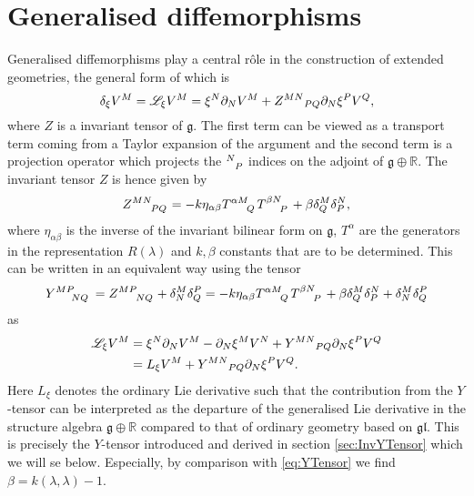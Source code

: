 \section{Generalised diffemorphisms}
Generalised diffemorphisms play a central rôle in the construction of extended geometries, the general form of which is
\begin{equation}
    \delta_\xi V^M = \mathscr{L}_\xi V^M = \xi^N\pd_N V^M+\tensor{Z}{^M^N}_{PQ}\pd_N\xi^PV^Q,
\end{equation}
where $Z$ is a invariant tensor of $\mathfrak{g}$. The first term can be viewed as a transport term coming from a Taylor expansion of the argument and the second term is a projection operator which projects the $\tensor{}{^N_P}$ indices on the adjoint of $\mathfrak{g}\oplus \mathbb{R}$. The invariant tensor $Z$ is hence given by 
\begin{equation}
    \tensor{Z}{^M^N_P_Q} = -k\eta_{\alpha\beta}\tensor{T}{^\alpha^M_Q}\tensor{T}{^\beta^N_P}+\beta\delta^M_Q\delta^N_P,
\end{equation}
where $\eta_{\alpha\beta}$ is the inverse of the invariant bilinear form on $\mathfrak{g}$, $T^{\alpha}$ are the generators in the representation $R(\lambda)$ and $k,\beta$ constants that are to be determined. This can be written in an equivalent way using the tensor
\begin{equation}\label{eq:Y}
    \tensor{Y}{^M^P_N_Q} = \tensor{Z}{^M^P_N_Q}+\delta^M_N\delta^P_Q = -k\eta_{\alpha\beta}\tensor{T}{^\alpha^M_Q}\tensor{T}{^\beta^N_P}+\beta\delta^M_Q\delta^N_P+\delta^M_N\delta^P_Q
\end{equation}
as 
\begin{equation}
    \begin{aligned}
        \mathscr{L}_\xi V^M &= \xi^N\pd_N V^M-\pd_N\xi^MV^N+\tensor{Y}{^M^N}_{PQ}\pd_N\xi^PV^Q\\
        &= L_\xi V^M+\tensor{Y}{^M^N}_{PQ}\pd_N\xi^PV^Q.
    \end{aligned}
\end{equation}
Here $L_\xi$ denotes the ordinary Lie derivative such that the contribution from the $Y$-tensor can be interpreted as the departure of the generalised Lie derivative in the structure algebra $\mathfrak{g}\oplus\mathbb{R}$ compared to that of ordinary geometry based on $\mathfrak{gl}$. This is precisely the $Y$-tensor introduced and derived in section \ref{sec:InvYTensor} which we will se below. Especially, by comparison with \eqref{eq:YTensor} we find $\beta = k(\lambda,\lambda)-1$. 

